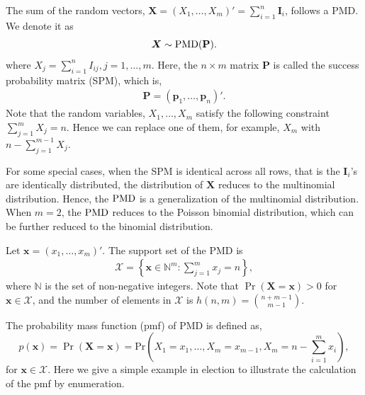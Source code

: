 \documentclass[12pt]{article}
\newcommand{\Ivec}{{\boldsymbol{I}}}
\newcommand{\Xset}{\mathcal{X}}
\newcommand{\Pmat}{\mathbf{P}}
\newcommand{\pvec}{\boldsymbol{p}}
\newcommand{\PMD}{{\normalfont\textrm{PMD}}}
\newcommand{\Xvec}{\boldsymbol{X}}
\newcommand{\xvec}{\boldsymbol{x}}
\begin{document}
The sum of the random vectors, $\Xvec = (X_{1}, \dots, X_{m})'= \sum_{i=1}^{n}\Ivec_{i}$, follows a PMD. We denote it as
$$\Xvec \sim \PMD(\Pmat).$$ where $X_{j} = \sum_{i=1}^{n} I_{ij}, j=1,\dots,m$. Here, the $n \times m$ matrix $\Pmat$ is called the success probability matrix (SPM), which is,
\begin{align*}
\Pmat = (\pvec_{1}, \dots, \pvec_{n} )'.
\end{align*}
Note that the random variables, $X_1, \dots, X_{m}$ satisfy the following constraint $\sum_{j=1}^{m}X_{j} = n.$ Hence we can replace one of them, for example, $X_m$ with $n-\sum_{j=1}^{m-1}X_j$.

For some special cases, when the SPM is identical across all rows, that is the $\Ivec_{i}$'s are identically distributed, the distribution of $\Xvec$ reduces to the multinomial distribution. Hence, the $\PMD$ is a generalization of the multinomial distribution. When $m=2$, the $\PMD$ reduces to the Poisson binomial distribution, which can be further reduced to the binomial distribution.


Let $\xvec = (x_1,\dots,x_m)'$. The support set of the PMD is
\begin{align*}
\Xset=\left\{\xvec\in \mathbb{N}^m: \sum_{j=1}^{m}x_j=n\right\},
\end{align*}
where $\mathbb{N}$ is the set of non-negative integers. Note that $\Pr(\Xvec=\xvec)>0$ for $\xvec\in\Xset$, and the number of elements in $\Xset$ is $h(n,m)=\binom{n+m-1}{m-1}$.

The probability mass function (pmf) of PMD is defined as,
$$p(\xvec)=\Pr(\Xvec=\xvec) = \text{Pr} \left( X_1 = x_1, \dots, X_m = x_{m-1}, X_{m} = n-\sum_{i=1}^{m}x_i \right),$$
for $\xvec\in\Xset$. Here we give a simple example in election to illustrate the calculation of the pmf by enumeration.
\end{document}
